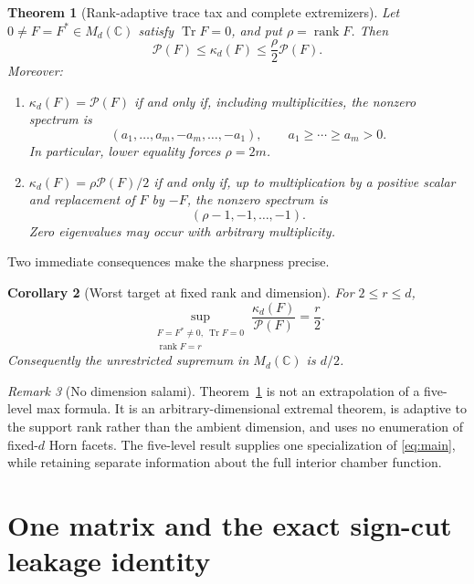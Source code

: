 \documentclass[11pt]{article}
\newtheorem{theorem}{Theorem}[section]
\newtheorem{corollary}[theorem]{Corollary}
\theoremstyle{definition}
\theoremstyle{remark}
\newtheorem{remark}[theorem]{Remark}
\newcommand{\Tr}{\operatorname{Tr}}
\newcommand{\rank}{\operatorname{rank}}
\newcommand{\1}{\mathbf 1}
\newcommand{\PP}{\mathcal P}
\begin{document}
\begin{theorem}[Rank-adaptive trace tax and complete extremizers]
\label{thm:main}
Let $0\ne F=F^*\in M_d(\mathbb C)$ satisfy $\Tr F=0$, and put $\rho=\rank F$.  Then
\begin{equation}
 \boxed{\quad
 \PP(F)\le \kappa_d(F)\le\frac{\rho}{2}\PP(F).
 \quad}
 \label{eq:main}
\end{equation}
Moreover:
\begin{enumerate}[label=\textup{(\roman*)},leftmargin=*]
 \item $\kappa_d(F)=\PP(F)$ if and only if, including multiplicities, the nonzero spectrum is
 \begin{equation}
  (a_1,\ldots,a_m,-a_m,\ldots,-a_1),
  \qquad a_1\ge\cdots\ge a_m>0.
  \label{eq:lower-equality}
 \end{equation}
 In particular, lower equality forces $\rho=2m$.
 \item $\kappa_d(F)=\rho\PP(F)/2$ if and only if, up to multiplication by a positive scalar and replacement of $F$ by $-F$, the nonzero spectrum is
 \begin{equation}
  (\rho-1,-1,\ldots,-1).
  \label{eq:upper-equality}
 \end{equation}
 Zero eigenvalues may occur with arbitrary multiplicity.
\end{enumerate}
\end{theorem}

Two immediate consequences make the sharpness precise.

\begin{corollary}[Worst target at fixed rank and dimension]
\label{cor:sup}
For $2\le r\le d$,
\[
 \sup_{\substack{F=F^*\ne0,\ \Tr F=0\\ \rank F=r}}
 \frac{\kappa_d(F)}{\PP(F)}=\frac r2.
\]
Consequently the unrestricted supremum in $M_d(\mathbb C)$ is $d/2$.
\end{corollary}

\begin{remark}[No dimension salami]
Theorem~\ref{thm:main} is not an extrapolation of a five-level max formula.  It is an arbitrary-dimensional extremal theorem, is adaptive to the support rank rather than the ambient dimension, and uses no enumeration of fixed-$d$ Horn facets.  The five-level result supplies one specialization of \eqref{eq:main}, while retaining separate information about the full interior chamber function.
\end{remark}

\section{One matrix and the exact sign-cut leakage identity}
\end{document}
